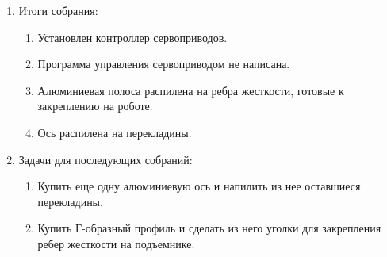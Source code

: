 \begin{enumerate}
\begin{enumerate}
    \end{enumerate}
    
	\item Итоги собрания: \newline
	\begin{enumerate}
	  \item Установлен контроллер сервоприводов.\newline
	  
      \item Программа управления сервоприводом не написана.\newline
      
      \item Алюминиевая полоса распилена на ребра жесткости, готовые к закреплению на роботе.\newline
      
      \item Ось распилена на перекладины.\newline
      
    \end{enumerate}
    
	\item Задачи для последующих собраний:\newline
	\begin{enumerate}
	  \item Купить еще одну алюминиевую ось и напилить из нее оставшиеся перекладины.\newline
	  
	  \item Купить Г-образный профиль и сделать из него уголки для закрепления ребер жесткости на подъемнике.\newline

    \end{enumerate}     
\end{enumerate}

\fillpage
